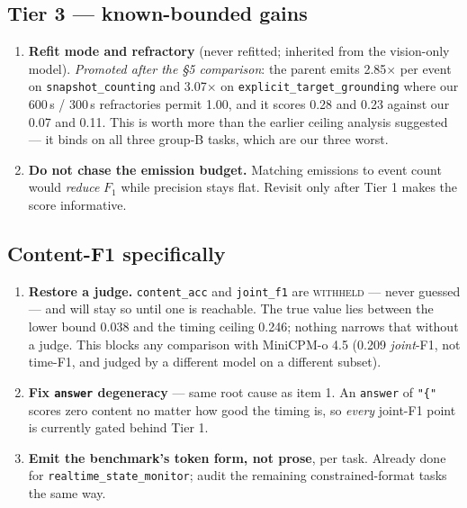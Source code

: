 \documentclass[11pt,a4paper]{article}
\begin{document}
\subsection*{Tier 3 --- known-bounded gains}

\begin{enumerate}[resume]
\item \textbf{Refit mode and refractory} (never refitted; inherited from the vision-only
model). \emph{Promoted after the \S5 comparison}: the parent emits 2.85$\times$ per event on
\texttt{snapshot\_counting} and 3.07$\times$ on \texttt{explicit\_target\_grounding} where our
600\,s / 300\,s refractories permit 1.00, and it scores 0.28 and 0.23 against our 0.07 and
0.11. This is worth more than the earlier ceiling analysis suggested --- it binds on all
three group-B tasks, which are our three worst.

\item \textbf{Do not chase the emission budget.} Matching emissions to event count would
\emph{reduce} $F_1$ while precision stays flat. Revisit only after Tier 1 makes the score
informative.
\end{enumerate}

\subsection*{Content-F1 specifically}

\begin{enumerate}[resume]
\item \textbf{Restore a judge.} \texttt{content\_acc} and \texttt{joint\_f1} are
\textsc{withheld} --- never guessed --- and will stay so until one is reachable. The true
value lies between the lower bound 0.038 and the timing ceiling 0.246; nothing narrows that
without a judge. This blocks any comparison with MiniCPM-o 4.5 (0.209 \emph{joint}-F1, not
time-F1, and judged by a different model on a different subset).

\item \textbf{Fix \texttt{answer} degeneracy} --- same root cause as item 1. An
\texttt{answer} of \texttt{"\{"} scores zero content no matter how good the timing is, so
\emph{every} joint-F1 point is currently gated behind Tier 1.

\item \textbf{Emit the benchmark's token form, not prose}, per task. Already done for
\texttt{realtime\_state\_monitor}; audit the remaining constrained-format tasks the same
way.
\end{enumerate}
\end{document}
